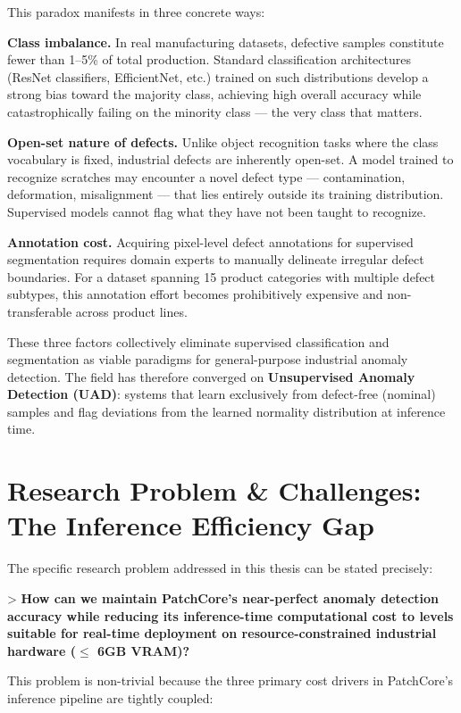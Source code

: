 \documentclass[12pt,a4paper,oneside]{report}
\begin{document}
This paradox manifests in three concrete ways:

\textbf{Class imbalance.} In real manufacturing datasets, defective samples constitute fewer than 1--5\% of total production. Standard classification architectures (ResNet classifiers, EfficientNet, etc.) trained on such distributions develop a strong bias toward the majority class, achieving high overall accuracy while catastrophically failing on the minority class --- the very class that matters.

\textbf{Open-set nature of defects.} Unlike object recognition tasks where the class vocabulary is fixed, industrial defects are inherently open-set. A model trained to recognize scratches may encounter a novel defect type --- contamination, deformation, misalignment --- that lies entirely outside its training distribution. Supervised models cannot flag what they have not been taught to recognize.

\textbf{Annotation cost.} Acquiring pixel-level defect annotations for supervised segmentation requires domain experts to manually delineate irregular defect boundaries. For a dataset spanning 15 product categories with multiple defect subtypes, this annotation effort becomes prohibitively expensive and non-transferable across product lines.

These three factors collectively eliminate supervised classification and segmentation as viable paradigms for general-purpose industrial anomaly detection. The field has therefore converged on \textbf{Unsupervised Anomaly Detection (UAD)}: systems that learn exclusively from defect-free (nominal) samples and flag deviations from the learned normality distribution at inference time.


\section{Research Problem & Challenges: The Inference Efficiency Gap}

The specific research problem addressed in this thesis can be stated precisely:

> \textbf{How can we maintain PatchCore's near-perfect anomaly detection accuracy while reducing its inference-time computational cost to levels suitable for real-time deployment on resource-constrained industrial hardware ($\le$ 6GB VRAM)?}

This problem is non-trivial because the three primary cost drivers in PatchCore's inference pipeline are tightly coupled:
\end{document}
